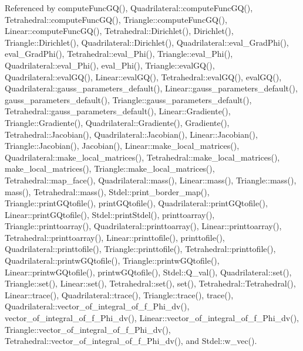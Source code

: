 Referenced by compute\+Func\+G\+Q(), Quadrilateral\+::compute\+Func\+G\+Q(), Tetrahedral\+::compute\+Func\+G\+Q(), Triangle\+::compute\+Func\+G\+Q(), Linear\+::compute\+Func\+G\+Q(), Tetrahedral\+::\+Dirichlet(), Dirichlet(), Triangle\+::\+Dirichlet(), Quadrilateral\+::\+Dirichlet(), Quadrilateral\+::eval\+\_\+\+Grad\+Phi(), eval\+\_\+\+Grad\+Phi(), Tetrahedral\+::eval\+\_\+\+Phi(), Triangle\+::eval\+\_\+\+Phi(), Quadrilateral\+::eval\+\_\+\+Phi(), eval\+\_\+\+Phi(), Triangle\+::eval\+G\+Q(), Quadrilateral\+::eval\+G\+Q(), Linear\+::eval\+G\+Q(), Tetrahedral\+::eval\+G\+Q(), eval\+G\+Q(), Quadrilateral\+::gauss\+\_\+parameters\+\_\+default(), Linear\+::gauss\+\_\+parameters\+\_\+default(), gauss\+\_\+parameters\+\_\+default(), Triangle\+::gauss\+\_\+parameters\+\_\+default(), Tetrahedral\+::gauss\+\_\+parameters\+\_\+default(), Linear\+::\+Gradiente(), Triangle\+::\+Gradiente(), Quadrilateral\+::\+Gradiente(), Gradiente(), Tetrahedral\+::\+Jacobian(), Quadrilateral\+::\+Jacobian(), Linear\+::\+Jacobian(), Triangle\+::\+Jacobian(), Jacobian(), Linear\+::make\+\_\+local\+\_\+matrices(), Quadrilateral\+::make\+\_\+local\+\_\+matrices(), Tetrahedral\+::make\+\_\+local\+\_\+matrices(), make\+\_\+local\+\_\+matrices(), Triangle\+::make\+\_\+local\+\_\+matrices(), Tetrahedral\+::map\+\_\+face(), Quadrilateral\+::mass(), Linear\+::mass(), Triangle\+::mass(), mass(), Tetrahedral\+::mass(), Stdel\+::print\+\_\+border\+\_\+map(), Triangle\+::print\+G\+Qtofile(), print\+G\+Qtofile(), Quadrilateral\+::print\+G\+Qtofile(), Linear\+::print\+G\+Qtofile(), Stdel\+::print\+Stdel(), printtoarray(), Triangle\+::printtoarray(), Quadrilateral\+::printtoarray(), Linear\+::printtoarray(), Tetrahedral\+::printtoarray(), Linear\+::printtofile(), printtofile(), Quadrilateral\+::printtofile(), Triangle\+::printtofile(), Tetrahedral\+::printtofile(), Quadrilateral\+::printw\+G\+Qtofile(), Triangle\+::printw\+G\+Qtofile(), Linear\+::printw\+G\+Qtofile(), printw\+G\+Qtofile(), Stdel\+::\+Q\+\_\+val(), Quadrilateral\+::set(), Triangle\+::set(), Linear\+::set(), Tetrahedral\+::set(), set(), Tetrahedral\+::\+Tetrahedral(), Linear\+::trace(), Quadrilateral\+::trace(), Triangle\+::trace(), trace(), Quadrilateral\+::vector\+\_\+of\+\_\+integral\+\_\+of\+\_\+f\+\_\+\+Phi\+\_\+dv(), vector\+\_\+of\+\_\+integral\+\_\+of\+\_\+f\+\_\+\+Phi\+\_\+dv(), Linear\+::vector\+\_\+of\+\_\+integral\+\_\+of\+\_\+f\+\_\+\+Phi\+\_\+dv(), Triangle\+::vector\+\_\+of\+\_\+integral\+\_\+of\+\_\+f\+\_\+\+Phi\+\_\+dv(), Tetrahedral\+::vector\+\_\+of\+\_\+integral\+\_\+of\+\_\+f\+\_\+\+Phi\+\_\+dv(), and Stdel\+::w\+\_\+vec().

